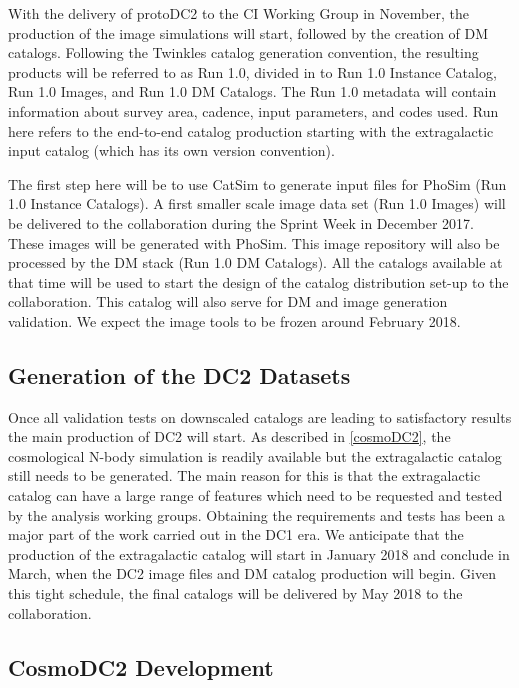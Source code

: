 \documentclass[preprint,times]{aastex61}
\begin{document}
With the delivery of protoDC2 to the CI Working Group in November, the production of the image simulations will start, followed by the creation of DM catalogs. Following the Twinkles catalog generation convention, the resulting products will be referred to as Run 1.0, divided in to Run 1.0 Instance Catalog, Run 1.0 Images, and Run 1.0 DM Catalogs. The Run 1.0 metadata will contain information about survey area, cadence, input parameters, and codes used. Run here refers to the end-to-end catalog production starting with the extragalactic input catalog (which has its own version convention).

The first step here will be to use CatSim to generate input files for PhoSim (Run 1.0 Instance Catalogs). 
A first smaller scale image data set (Run 1.0 Images) will be delivered to the collaboration during the Sprint Week in December 2017. These images will be generated with PhoSim. This image repository will also be processed by the DM stack (Run 1.0 DM Catalogs). All the catalogs available at that time will be used to start the design of the catalog distribution set-up to the collaboration. This catalog will also serve for DM and image generation validation. We expect the image tools to be frozen around February 2018.

\subsection{Generation of the DC2 Datasets}

Once all validation tests on downscaled catalogs are leading to satisfactory results the main production of DC2 will start. As described in \autoref{cosmoDC2}, the cosmological N-body simulation is readily available but the extragalactic catalog still needs to be generated. The main reason for this is that the extragalactic catalog can have a large range of features which need to be requested and tested by the analysis working groups. Obtaining the requirements and tests has been a major part of the work carried out in the DC1 era. We anticipate that the production of the extragalactic catalog will start in January 2018 and conclude in March, when the DC2 image files and DM catalog production will begin. Given this tight schedule, the final catalogs will be delivered by May 2018 to the collaboration.

\subsection{CosmoDC2 Development}
\end{document}
